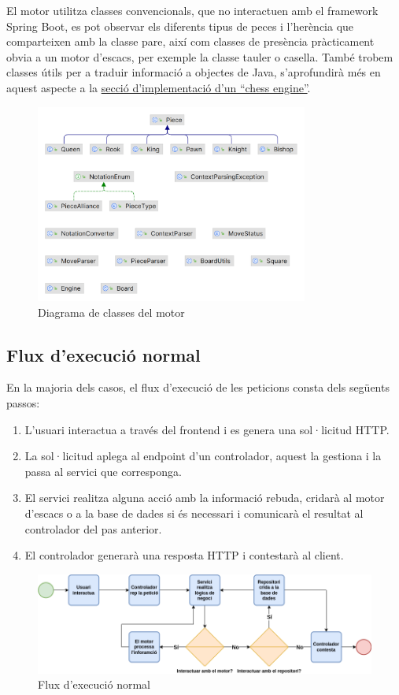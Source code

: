 \noindent
El motor utilitza classes convencionals, que no interactuen amb el framework Spring Boot, es pot observar els diferents tipus de peces i l'herència que comparteixen amb la classe pare, així com classes de presència pràcticament obvia a un motor d'escacs, per exemple la classe tauler o casella. També trobem classes útils per a traduir informació a objectes de Java, s'aprofundirà més en aquest aspecte a la \hyperref[sec:engine]{secció d'implementació d’un “chess engine”}.
\begin{figure}[H]
    \centering
    \includegraphics[width=0.8\textwidth]{images/engine.png}
    \caption{Diagrama de classes del motor}
    \label{fig:Diagrama de classes del motor}
\end{figure}
\subsection{Flux d'execució normal}
En la majoria dels casos, el flux d'execució de les peticions consta dels següents passos:
\begin{enumerate}
    \item L'usuari interactua a través del frontend i es genera una sol·licitud HTTP.
    \item La sol·licitud aplega al endpoint d'un controlador, aquest la gestiona i la passa al servici que corresponga.
    \item El servici realitza alguna acció amb la informació rebuda, cridarà al motor d'escacs o a la base de dades si és necessari i comunicarà el resultat al controlador del pas anterior.
    \item El controlador generarà una resposta HTTP i contestarà al client.
\end{enumerate}
\begin{figure}[H]
    \centering
    \includegraphics[width=\textwidth]{images/fluxe.png}
    \caption{Flux d'execució normal}
    \label{fig:Flux d'execució normal}
\end{figure}
